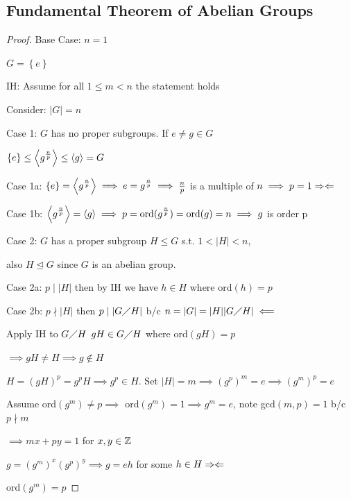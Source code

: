\subsection{Fundamental Theorem of Abelian Groups}



\begin{proof}
    Base Case: $n=1$

    $G=\left\{ e \right\}$

    IH: Assume for all $1\leq m < n$ the statement holds

    Consider: $|G|=n$

    Case 1: $G$ has no proper subgroups. If $e \neq g \in G$

    $\left\{ e \right\}\leq\left\langle g^{\frac{n}{p}} \right\rangle\leq\left\langle g \right\rangle=G$ 

    Case 1a: $\left\{ e \right\}=\left\langle g^{\frac{n}{p}} \right\rangle \implies e=g^{\frac{n}{p}} \implies \frac{n}{p}$
    is a multiple of $n \implies p=1 \Rightarrow \Leftarrow$ 

    Case 1b: $\left\langle g^{\frac{n}{p}} \right\rangle=\left\langle g \right\rangle \implies p=\text{ord}(g^{\frac{n}{p}})=\text{ord}(g)=n \implies g$ is order p

    Case 2: $G$ has a proper subgroup $H \leq G$ s.t. $1<|H|<n$,
    
    also $H \unlhd G$ since $G$ is an abelian group.

    Case 2a: $p \mid |H|$ then by IH we have $h \in H$ where ord$(h)=p$

    Case 2b: $p\nmid |H|$ then $p \mid |G \diagup H|$ b/c $n=|G|=|H||G \diagup H| \impliedby$ 

    Apply IH to $G \diagup H$ $gH \in G\diagup H$ where ord$(gH)=p$

    $\implies gH \neq H \implies g \notin H$

    $H=(gH)^p=g^pH \implies g^p \in H$. Set $|H|=m \implies (g^p)^m=e \implies (g^m)^p=e$

    Assume ord$(g^m)\neq p \implies$ ord$(g^m)=1 \implies g^m=e$, note gcd$(m,p)=1$ b/c $p \nmid m$

    $\implies mx+py=1$ for $x,y \in \mathbb{Z}$

    $g=(g^m)^x(g^p)^y \implies g=eh$ for some $h \in H \Rightarrow \Leftarrow$

    ord$(g^m)=p$
\end{proof}


